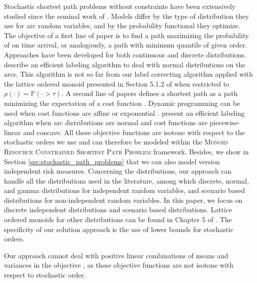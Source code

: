 \documentclass[11pt]{amsart}
\theoremstyle{plain}
\theoremstyle{remark}
\def\P{\mathbb{P}}
\newcommand{\MRCSP}{\textsc{Monoid Resource Constrained Shortest Path Problem}\xspace}
\newcommand{\rmeas}{\rho}
\begin{document}
Stochastic shortest path problems without constraints have been extensively studied since the seminal work of \citet{frank1969shortest}. Models differ by the type of distribution they use for arc random variables, and by the probability functional they optimize. The objective of a first line of paper is to find a path maximizing the probability of on time arrival, or analogously, a path with minimum quantile of given order. Approaches have been developed for both continuous \citep{frank1969shortest,chen2005path,nikolova2006stochastic,nikolova2010high} and discrete \citep{mirchandani1976shortest} distributions. \citet{chen2013finding} describe an efficient labeling algorithm to deal with normal distributions on the arcs. This algorithm is not so far from our label correcting algorithm applied with the lattice ordered monoid presented in Section 5.1.2 of \cite{parmentier2016thesis} when restricted to $\rmeas(\cdot) = \P(\cdot > \tau)$. A second line of papers defines a shortest path as a path minimizing the expectation of a cost function \citep{loui1983optimal}.
Dynamic programming can be used when cost functions are affine or exponential \citep{eiger1985path}.
\citet{murthy1996relaxation,murthy1998stochastic} present an efficient labeling algorithm when arc distributions are normal and cost functions are piecewise-linear and concave. All these objective functions are isotone with respect to the stochastic orders we use and can therefore be modeled within the \MRCSP framework. Besides, we show in Section \ref{sec:stochastic_path_problems} that we can also model version independent risk measures. Concerning the distributions, our approach can handle all the distributions used in the literature, among which discrete, normal, and gamma distributions for independent random variables, and scenario based distributions for non-independent random variables. In this paper, we focus on discrete independent distributions and scenario based distributions. Lattice ordered monoids for other distributions can be found in Chapter 5 of \cite{parmentier2016thesis}. The specificity of our solution approach is the use of lower bounds for stochastic orders.

Our approach cannot deal with positive linear combinations of means and variances in the objective \cite{sivakumar1994variance,nikolova2006stochastic,nikolova2010high}, as these objective functions are not isotone with respect to stochastic order.
\end{document}
